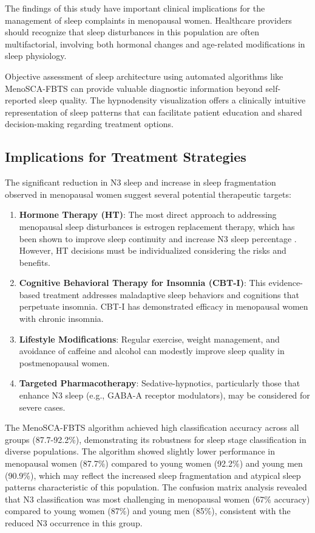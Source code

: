 \documentclass[ASNA,twocolumn]{USG}
\begin{document}
The findings of this study have important clinical implications for the management of sleep complaints in menopausal women. Healthcare providers should recognize that sleep disturbances in this population are often multifactorial, involving both hormonal changes and age-related modifications in sleep physiology.

Objective assessment of sleep architecture using automated algorithms like MenoSCA-FBTS can provide valuable diagnostic information beyond self-reported sleep quality. The hypnodensity visualization offers a clinically intuitive representation of sleep patterns that can facilitate patient education and shared decision-making regarding treatment options.

\subsection{Implications for Treatment Strategies}

The significant reduction in N3 sleep and increase in sleep fragmentation observed in menopausal women suggest several potential therapeutic targets:

\begin{enumerate}
\item \textbf{Hormone Therapy (HT)}: The most direct approach to addressing menopausal sleep disturbances is estrogen replacement therapy, which has been shown to improve sleep continuity and increase N3 sleep percentage \cite{PoloKantola1998}. However, HT decisions must be individualized considering the risks and benefits.
\item \textbf{Cognitive Behavioral Therapy for Insomnia (CBT-I)}: This evidence-based treatment addresses maladaptive sleep behaviors and cognitions that perpetuate insomnia. CBT-I has demonstrated efficacy in menopausal women with chronic insomnia.
\item \textbf{Lifestyle Modifications}: Regular exercise, weight management, and avoidance of caffeine and alcohol can modestly improve sleep quality in postmenopausal women.
\item \textbf{Targeted Pharmacotherapy}: Sedative-hypnotics, particularly those that enhance N3 sleep (e.g., GABA-A receptor modulators), may be considered for severe cases.
\end{enumerate}

The MenoSCA-FBTS algorithm achieved high classification accuracy across all groups (87.7-92.2\%), demonstrating its robustness for sleep stage classification in diverse populations. The algorithm showed slightly lower performance in menopausal women (87.7\%) compared to young women (92.2\%) and young men (90.9\%), which may reflect the increased sleep fragmentation and atypical sleep patterns characteristic of this population. The confusion matrix analysis revealed that N3 classification was most challenging in menopausal women (67\% accuracy) compared to young women (87\%) and young men (85\%), consistent with the reduced N3 occurrence in this group.
\end{document}
